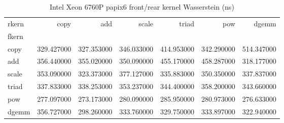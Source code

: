 \begin{table}
\caption{Intel Xeon 6760P papix6 front/rear kernel Wasserstein (ns)}
\begin{tabular}{lrrrrrr}
\toprule
rkern & copy & add & scale & triad & pow & dgemm \\
fkern &  &  &  &  &  &  \\
\midrule
copy & 329.427000 & 327.353000 & 346.033000 & 414.953000 & 342.290000 & 514.347000 \\
add & 356.440000 & 355.020000 & 350.090000 & 455.170000 & 458.287000 & 318.177000 \\
scale & 353.090000 & 323.373000 & 377.127000 & 335.883000 & 350.350000 & 337.837000 \\
triad & 337.833000 & 338.253000 & 353.237000 & 344.400000 & 358.200000 & 343.660000 \\
pow & 277.097000 & 273.173000 & 280.090000 & 285.950000 & 280.973000 & 276.633000 \\
dgemm & 356.727000 & 298.260000 & 333.760000 & 329.750000 & 333.897000 & 322.940000 \\
\bottomrule
\end{tabular}
\end{table}
